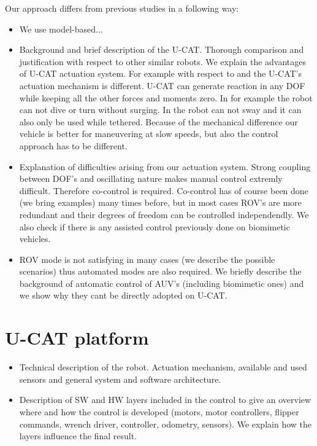 \documentclass[conference]{IEEEtran}
\begin{document}
Our approach differs from previous studies in a following way:

\begin{itemize}

\item  We use model-based...

\end{itemize}



\begin{itemize}
	\item Background and brief description of the U-CAT. Thorough comparison and justification with respect to other similar robots. We explain the advantages of U-CAT actuation system. For example with respect to \cite{geder2013maneuvering} and \cite{plamondon2013adaptive} the U-CAT's actuation mechanism is different. U-CAT can generate reaction in any DOF while keeping all the other forces and moments zero. In \cite{geder2013maneuvering} for example the robot can not dive or turn without surging. In \cite{plamondon2013adaptive} the robot can not sway and it can also only be used while tethered. Because of the mechanical difference our vehicle is better for maneuvering at slow speeds, but also the control approach has to be different. 
	\item Explanation of difficulties arising from our actuation system. 
Strong coupling between DOF's and oscillating nature makes manual control extremly difficult. 
Therefore co-control is required. 
Co-control has of course been done (we bring examples) many times before, but in most cases ROV's are more redundant and their degrees of freedom can be controlled independendly. We also check if there is any assisted control previously done on biomimetic vehicles.
	\item ROV mode is not satisfying in many cases (we describe the possible scenarios) thus automated modes are also required. 
We briefly describe the background of automatic control of AUV's (including biomimetic ones) and we show why they cant be directly adopted on U-CAT.
\end{itemize}




\section{U-CAT platform}

\begin{itemize}
	\item
Technical description of the robot. 
Actuation mechanism, available and used sensors and general system and software architecture.
	\item
Description of SW and HW layers included in the control to give an overview where and how the control is developed (motors, motor controllers, flipper commands, wrench driver, controller, odometry, sensors).
We explain how the layers influence the final result.
\end{itemize}
\end{document}
